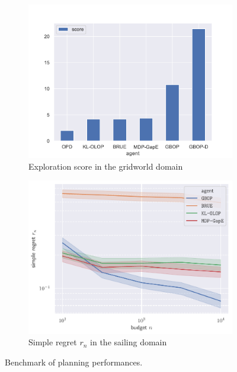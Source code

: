 \documentclass[runningheads]{llncs}
\begin{document}
\begin{figure}[ht]
	\centering
	\begin{subfigure}[b]{0.49\textwidth}
		\includegraphics[trim = {0 0 0 0}, clip, width=\linewidth]{img/score.pdf}
		\caption{Exploration score in the gridworld domain}
		\label{fig:exploration}
	\end{subfigure}
	\hfill%
	\begin{subfigure}[b]{0.49\textwidth}
		\includegraphics[trim = {0 0 0 0}, clip, width=\linewidth]{img/simple_regret.pdf}
		\caption{Simple regret $r_n$ in the sailing domain}
		\label{fig:sailing}
	\end{subfigure}
	\caption{Benchmark of planning performances.}
\end{figure}
\end{document}
